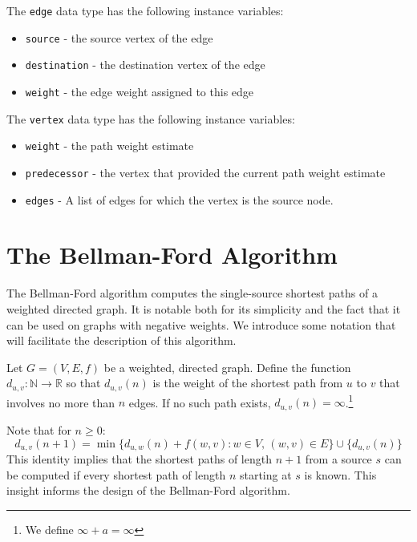 \documentclass[12pt,twoside]{reedthesis}
\newcommand{\var}[1]{{\mbox{\tt#1}}}
\begin{document}
\setlength{\parindent}{0cm}

The \var{edge} data type has the following instance variables:

\begin{itemize}
\item \var{source} - the source vertex of the edge
\item \var{destination} - the destination vertex of the edge
\item \var{weight} - the edge weight assigned to this edge
\end{itemize}

The \var{vertex} data type has the following instance variables:

\begin{itemize}
\item \var{weight} - the path weight estimate
\item \var{predecessor} - the vertex that provided the current path weight estimate
\item \var{edges} - A list of edges for which the vertex is the source node.
\end{itemize}

\setlength{\parindent}{.5cm}

\section{The Bellman-Ford Algorithm}
\label{sec:bf}

The Bellman-Ford algorithm computes the single-source shortest paths of a weighted directed graph. It is notable both for its simplicity and the fact that it can be used on graphs with negative weights. We introduce some notation that will facilitate the description of this algorithm.
\vspace{1pc}

\setlength{\parindent}{0cm}
Let $G = (V,E,f)$ be a weighted, directed graph. Define the function $d_{u,v} : \mathbb{N} \rightarrow \mathbb{R}$ so that $d_{u,v}(n)$ is the weight of the shortest path from $u$ to $v$ that involves no more than $n$ edges. If no such path exists, $d_{u,v}(n) = \infty$.\footnote{We define $\infty + a = \infty$}
\setlength{\parindent}{.5cm}
\vspace{1pc}

Note that for $n \geq 0$:
\begin{equation}
\label{eq:did}
d_{u,v}(n+1) = \min \{d_{u,w}(n) + f(w,v) : w \in V, \, (w,v) \in E \} \cup \{d_{u,v}(n)\}
\end{equation}
This identity implies that the shortest paths of length $n+1$ from a source $s$ can be computed if every shortest path of length $n$ starting at $s$ is known. This insight informs the design of the Bellman-Ford algorithm. 
\end{document}
